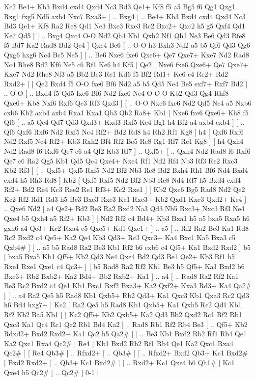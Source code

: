 Kc2 Be4+  Kb3 Bxd4  cxd4 Qxd4  Nc3 Bd3  Qe1+ Kf8  f5 a5  Bg5 f6  Qg1 Qxg1  Rxg1 fxg5  Nd5 axb4  Nxc7 Rxa3+   ] .. Bxg4 [ .. Be4+  Kb3 Bxd4  cxd4 Qxd4  Nc3 Bd3  Qe1+ Kf8  Ra2 Re8  Qd1 Ne3  Bxe3 Rxe3  Rc2 Bxc2+  Qxc2 h5  g5 Qxf4  Qd1 Ke7  Qd5   ]  [ .. Bxg4  Qxc4 O-O  Nd2 Qh4  Kb1 Qxh2  Nf1 Qh1  Ne3 Be6  Qd3 Rfe8  f5 Bd7  Ka2 Rad8  Bd2 Qe4   ]  Qxc4   Be6 [ .. O-O  h3 Bxh3  Nd2 a5  b5 Qf6  Qd3 Qg6  Qxg6 hxg6  Nc4 Bc5  Ne5   ]  [ .. Be6  Nxe6 fxe6  Qxe6+ Qe7  Qxe7+ Kxe7  Nd2 Rad8  Nc4 Rhe8  Bd2 Kf6  Ne5 c6  Rf1 Ke6  h4 Kf5   ]  Qe2 [  Nxe6 fxe6  Qxe6+ Qe7  Qxe7+ Kxe7  Nd2 Rhe8  Nf3 a5  Bb2 Be3  Re1 Kd6  f5 Bf2  Rd1+ Kc6  c4 Re2+  Rd2 Rxd2+   ]  [  Qe2 Bxd4  f5 O-O  fxe6 Bf6  Nd2 a5  b5 Qd5  Ne4 Be5  exf7+ Rxf7  Bd2   ] .. O-O [ .. Bxd4  f5 Qd5  fxe6 Bf6  Nd2 fxe6  Ne4 O-O-O  Kb2 Qd3  Qg4 Rhf8  Qxe6+ Kb8  Nxf6 Rxf6  Qe3 Rf3  Qxd3   ]  [ .. O-O  Nxe6 fxe6  Nd2 Qd5  Nc4 a5  Nxb6 cxb6  Kb2 axb4  axb4 Rxa1  Kxa1 Qb3  Qb2 Ra8+  Kb1   ]  Nxe6   fxe6    Qxe6+   Kh8    f5   Qf6 [ .. a5  Qe4 Qd7  Qd3 Qxd3+  Kxd3 Rxf5  Kc4 Bg1  h4 Bf2  a4 axb4  cxb4   ]  [ .. Qf6  Qxf6 Rxf6  Nd2 Rxf5  Nc4 Rf2+  Bd2 Rd8  h4 Rh2  Rf1 Kg8   ]  h4 [  Qxf6 Rxf6  Nd2 Rxf5  Nc4 Rf2+  Kb3 Rxh2  Bf4 Rf2  Be5 Re8  Rg1 Rf7  Re1 Kg8   ]  [  h4 Qxh4  Nd2 Rad8  f6 Rxf6  Qe7 c6  a4 Qf2  Kb3 Rf7   ] .. Qxf5+ [ .. Qxh4  Nd2 Rad8  f6 Rxf6  Qe7 c6  Ra2 Qg5  Kb1 Qd5  Qe4 Qxe4+  Nxe4 Rf1  Nd2 Rf4  Nb3 Rf3  Re2 Rxc3  Kb2 Rf3   ]  [ .. Qxf5+  Qxf5 Rxf5  Nd2 Bf2  Nb3 Re8  Bd2 Bxh4  Rh1 Bf6  Nd4 Bxd4  cxd4 h5  Rh3 Rd8   ]  Kb2 [  Qxf5 Rxf5  Nd2 Bf2  Nb3 Re8  Nd4 Rf7  h5 Bxd4  cxd4 Rf2+  Bd2 Re4  Kc3 Ree2  Re1 Rf3+  Kc2 Rxe1   ]  [  Kb2 Qxe6  Bg5 Rad8  Nd2 Qe2  Kc2 Rf2  Rd1 Rd3  h5 Be3  Bxe3 Rxe3  Kc1 Rxc3+  Kb2 Qxd1  Kxc3 Qxd2+  Kc4   ] .. Qxe6    Nd2 [  a4 Qe2+  Bd2 Be3  Ra2 Bxd2  Na3 Qd3  Nb5 Bxc3+  Nxc3 Rf3  Ne4 Qxe4  b5 Qxh4  a5 Rf2+  Kb3   ]  [  Nd2 Rf2  c4 Bd4+  Kb3 Bxa1  h5 a5  bxa5 Rxa5  h6 gxh6  a4 Qe3+  Kc2 Rxa4  c5 Qxc5+  Kd1 Qxc1+   ] .. a5 [ .. Rf2  Ra2 Be3  Ka1 Rd8  Rc2 Bxd2  c4 Qe5+  Ka2 Qe4  Kb3 Qd3+  Rc3 Qxc3+  Ka4 Bxc1  Ka5 Bxa3  c5 Qxb4#   ]  [ .. a5  b5 Rad8  Ra2 Be3  Kb1 Rf2  b6 cxb6  c4 Qf5+  Ka1 Bxd2  Rxd2   ]  b5 [  bxa5 Bxa5  Kb1 Qf5+  Kb2 Qd3  Ne4 Qxe4  Bd2 Qd3  Be1 Qe2+  Kb3 Rf1  h5 Rxe1  Rxe1 Qxe1  c4 Qc3+   ]  [  b5 Rad8  Ra2 Rf2  Kb1 Be3  h5 Qf5+  Ka1 Bxd2  b6 Bxc3+  Rb2 Bxb2+  Ka2 Bd4+  Bb2 Rxb2+  Ka1   ] .. a4 [ .. Rad8  Ra2 Rf2  Ka1 Be3  Rc2 Bxd2  c4 Qe1  Kb1 Bxc1  Rxf2 Bxa3+  Ka2 Qxf2+  Kxa3 Rd3+  Ka4 Qa2#   ]  [ .. a4  Ra2 Qe5  h5 Rad8  Kb1 Qxb5+  Rb2 Qd3+  Ka1 Qxc3  Kb1 Qxa3  Rc2 Qd3  h6 Bd4  hxg7+   ]  Kc2 [  Ra2 Qe5  h5 Rad8  Kb1 Qxb5+  Ka1 Qxh5  Rc2 Qd1  Kb1 Rf2  Kb2 Ba5  Kb1   ]  [  Kc2 Qf5+  Kb2 Qxb5+  Ka2 Qd3  Bb2 Qxd2  Rc1 Rf2  Rb1 Qxc3  Ka1 Qc4  Rc1 Qe2  Rb1 Bd4  Ka2   ] .. Rad8    Rb1   Rf2    Rb4   Be3 [ .. Qf5+  Kb2 Rdxd2+  Bxd2 Rxd2+  Ka1 Qc2  h5 Qa2#   ]  [ .. Be3  Kb1 Bxd2  Rb2 Rf1  Rb4 Qe1  Ka2 Qxc1  Rxa4 Qc2#   ]  Re4 [  Kb1 Bxd2  Rb2 Rf1  Rb4 Qe1  Ka2 Qxc1  Rxa4 Qc2#   ]  [  Re4 Qb3#   ] .. Rfxd2+ [ .. Qb3#   ]  [ .. Rfxd2+  Bxd2 Qb3+  Kc1 Bxd2#   ]  Bxd2   Rxd2+ [ .. Qb3+  Kc1 Bxd2#   ]  [ .. Rxd2+  Kc1 Qxe4  b6 Qh1#   ]  Kc1   Qxe4    h5   Qc2#    [ .. Qc2#   ] 0-1  |
